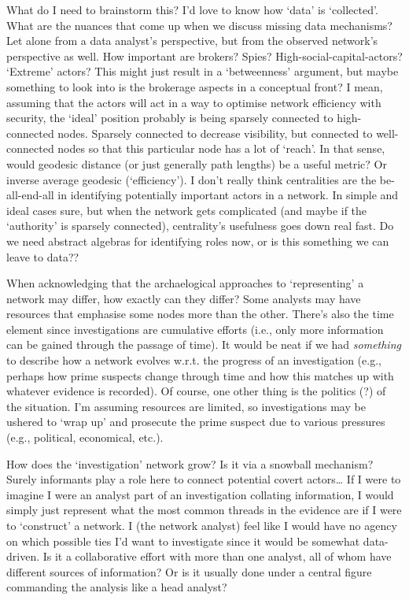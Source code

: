\documentclass[
]{article}
\begin{document}
What do I need to brainstorm this? I'd love to know how `data' is
`collected'. What are the nuances that come up when we discuss missing
data mechanisms? Let alone from a data analyst's perspective, but from
the observed network's perspective as well. How important are brokers?
Spies? High-social-capital-actors? `Extreme' actors? This might just
result in a `betweenness' argument, but maybe something to look into is
the brokerage aspects in a conceptual front? I mean, assuming that the
actors will act in a way to optimise network efficiency with security,
the `ideal' position probably is being sparsely connected to
high-connected nodes. Sparsely connected to decrease visibility, but
connected to well-connected nodes so that this particular node has a lot
of `reach'. In that sense, would geodesic distance (or just generally
path lengths) be a useful metric? Or inverse average geodesic
(`efficiency'). I don't really think centralities are the be-all-end-all
in identifying potentially important actors in a network. In simple and
ideal cases sure, but when the network gets complicated (and maybe if
the `authority' is sparsely connected), centrality's usefulness goes
down real fast. Do we need abstract algebras for identifying roles now,
or is this something we can leave to data??

When acknowledging that the archaelogical approaches to `representing' a
network may differ, how exactly can they differ? Some analysts may have
resources that emphasise some nodes more than the other. There's also
the time element since investigations are cumulative efforts (i.e., only
more information can be gained through the passage of time). It would be
neat if we had \emph{something} to describe how a network evolves w.r.t.
the progress of an investigation (e.g., perhaps how prime suspects
change through time and how this matches up with whatever evidence is
recorded). Of course, one other thing is the politics (?) of the
situation. I'm assuming resources are limited, so investigations may be
ushered to `wrap up' and prosecute the prime suspect due to various
pressures (e.g., political, economical, etc.).

How does the `investigation' network grow? Is it via a snowball
mechanism? Surely informants play a role here to connect potential
covert actors\ldots{} If I were to imagine I were an analyst part of an
investigation collating information, I would simply just represent what
the most common threads in the evidence are if I were to `construct' a
network. I (the network analyst) feel like I would have no agency on
which possible ties I'd want to investigate since it would be somewhat
data-driven. Is it a collaborative effort with more than one analyst,
all of whom have different sources of information? Or is it usually done
under a central figure commanding the analysis like a head analyst?
\end{document}
